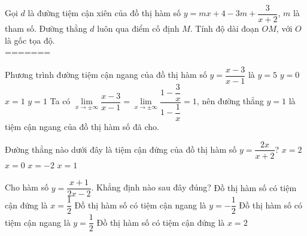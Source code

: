 \begin{ex}
    Gọi $d$ là đường tiệm cận xiên của đồ thị hàm số $y=mx+4-3m+\dfrac{3}{x+2}$, $m$ là tham số. Đường thẳng $d$ luôn qua điểm cố định $M$. Tính độ dài đoạn $OM$, với $O$ là gốc tọa độ.\\
=======
\boxde
\BTTN
\begin{ex}%
    Phương trình đường tiệm cận ngang của đồ thị hàm số $y=\dfrac{x-3}{x-1}$ là
    \choice
    {$y=5$}
    {$y=0$}
    {$x=1$}
    {\True $y=1$}
    \loigiai
    {
        Ta có $\lim\limits_{x \to \pm \infty}\dfrac{x-3}{x-1} = \lim\limits_{x \to \pm \infty}\dfrac{1-\dfrac{3}{x}}{1-\dfrac{1}{x}}=1$, nên đường thẳng $y=1$ là tiệm cận ngang của đồ thị hàm số đã cho.
    }
\end{ex}


\begin{ex}
    Đường thẳng nào dưới đây là tiệm cận đứng của đồ thị hàm số $y=\dfrac{2x}{x+2}$?
    \choice
    {$x=2$}
    {$x=0$}
    {\True $x=-2$}
    {$x=1$}
\end{ex}

\begin{ex}%
    Cho hàm số $y=\dfrac{x+1}{2x-2}$. Khẳng định nào sau đây đúng?
    \choice
    {Đồ thị hàm số có tiệm cận đứng là $x=\dfrac{1}{2}$}
    {Đồ thị hàm số có tiệm cận ngang là $y=-\dfrac{1}{2}$}
    {\True Đồ thị hàm số có tiệm cận ngang là $y=\dfrac{1}{2}$}
    {Đồ thị hàm số có tiệm cận đứng là $x=2$}
\end{ex}



\end{ex}
